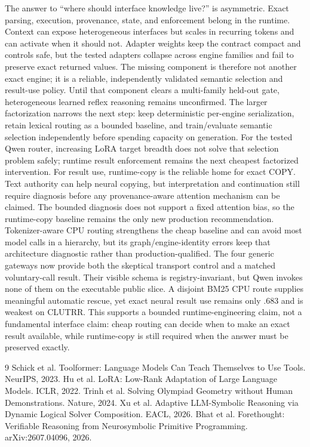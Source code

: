 \documentclass[10pt]{article}
\begin{document}
The answer to ``where should interface knowledge live?'' is asymmetric.  Exact
parsing, execution, provenance, state, and enforcement belong in the runtime.
Context can expose heterogeneous interfaces but scales in recurring tokens and
can activate when it should not.  Adapter weights keep the contract compact and
controls safe, but the tested adapters collapse across engine families and fail
to preserve exact returned values.  The missing component is therefore not
another exact engine; it is a reliable, independently validated semantic
selection and result-use policy.  Until that component clears a multi-family
held-out gate, heterogeneous learned reflex reasoning remains unconfirmed.
The larger factorization narrows the next step: keep deterministic per-engine
serialization, retain lexical routing as a bounded baseline, and train/evaluate
semantic selection independently before spending capacity on generation.
For the tested Qwen router, increasing LoRA target breadth does not solve that
selection problem safely; runtime result enforcement remains the next cheapest
factorized intervention.
For result use, runtime-copy is the reliable home for exact COPY.  Text authority
can help neural copying, but interpretation and continuation still require
diagnosis before any provenance-aware attention mechanism can be claimed.  The
bounded diagnosis does not support a fixed attention bias, so the runtime-copy
baseline remains the only new production recommendation.
Tokenizer-aware CPU routing strengthens the cheap baseline and can avoid most
model calls in a hierarchy, but its graph/engine-identity errors keep that
architecture diagnostic rather than production-qualified.
The four generic gateways now provide both the skeptical transport control and a
matched voluntary-call result.  Their visible schema is registry-invariant, but
Qwen invokes none of them on the executable public slice.  A disjoint BM25 CPU
route supplies meaningful automatic rescue, yet exact neural result use remains
only .683 and is weakest on CLUTRR.  This supports a bounded runtime-engineering
claim, not a fundamental interface claim: cheap routing can decide when to make
an exact result available, while runtime-copy is still required when the answer
must be preserved exactly.

\begin{thebibliography}{9}
 Schick et al. Toolformer: Language Models Can Teach Themselves to Use Tools. NeurIPS, 2023.
 Hu et al. LoRA: Low-Rank Adaptation of Large Language Models. ICLR, 2022.
 Trinh et al. Solving Olympiad Geometry without Human Demonstrations. Nature, 2024.
 Xu et al. Adaptive LLM-Symbolic Reasoning via Dynamic Logical Solver Composition. EACL, 2026.
 Bhat et al. Forethought: Verifiable Reasoning from Neurosymbolic Primitive Programming. arXiv:2607.04096, 2026.
\end{thebibliography}
\end{document}
